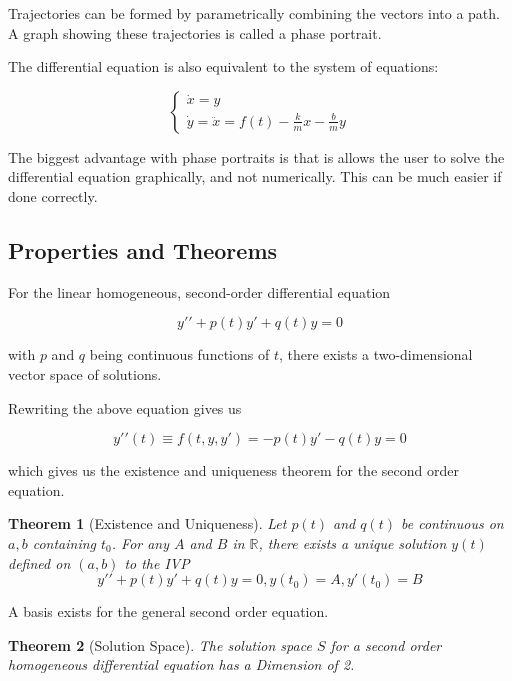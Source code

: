 \documentclass[12pt, landscape, twocolumn]{article}
\newtheorem{thm}{Theorem}
\begin{document}
        Trajectories can be formed by parametrically combining the vectors into a path. A graph showing these trajectories is called a phase portrait.

        The differential equation is also equivalent to the system of equations:

            \[ \begin{cases}
                    \dot{x} = y\\
                    \dot{y} = \ddot{x} = f(t) - \frac{k}{m} x - \frac{b}{m} y
                \end{cases} \]

        The biggest advantage with phase portraits is that is allows the user to solve the differential equation graphically, and not numerically. This can be much easier if done correctly.

    \subsection{Properties and Theorems}
    For the linear homogeneous, second-order differential equation

        \[
            y\prime\prime + p(t) y\prime + q(t)y = 0
        \]

    with $p$ and $q$ being continuous functions of $t$, there exists a two-dimensional vector space of solutions.

    Rewriting the above equation gives us

        \[
            y\prime\prime(t) \equiv f(t, y, y\prime) = -p(t) y\prime - q(t) y = 0
        \]

    which gives us the existence and uniqueness theorem for the second order equation.

        \begin{thm}[Existence and Uniqueness]\label{thm:2eau}
            Let $p(t)$ and $q(t)$ be continuous on $a, b$ containing $t_0$. For any $A$ and $B$ in $\mathbb{R}$, there exists a unique solution $y(t)$ defined on $(a, b)$ to the IVP
            \[
            y\prime\prime + p(t) y\prime + q(t)y = 0, y(t_0) = A, y\prime(t_0) = B
            \]
        \end{thm}

    A basis exists for the general second order equation.

        \begin{thm}[Solution Space]\label{thm:solutionspace}
            The solution space $S$ for a second order homogeneous differential equation has a Dimension of 2.
        \end{thm}
\end{document}
